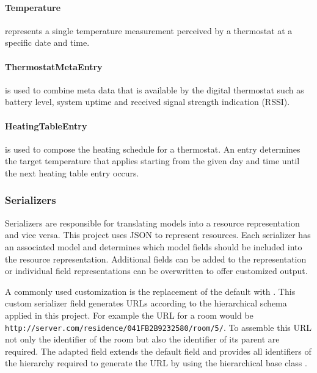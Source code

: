 \paragraph{Temperature} represents a single temperature measurement perceived by a thermostat at a specific date and time.

\paragraph{ThermostatMetaEntry} is used to combine meta data that is available by the digital thermostat such as battery level, system uptime and received signal strength indication (RSSI).

\paragraph{HeatingTableEntry} is used to compose the heating schedule for a thermostat.
An entry determines the target temperature that applies starting from the given day and time until the next heating table entry occurs.

\subsubsection{Serializers}
\label{sec:server_infrastructure_serializers}

Serializers are responsible for translating models into a resource representation and vice versa.
This project uses JSON to represent resources.
Each serializer has an associated model and determines which model fields should be included into the resource representation.
Additional fields can be added to the representation or individual field representations can be overwritten to offer customized output.

A commonly used customization is the replacement of the default  with .
This custom serializer field generates URLs according to the hierarchical schema applied in this project.
For example the URL for a room would be \nolinkurl{http://server.com/residence/041FB2B9232580/room/5/}.
To assemble this URL not only the identifier of the room but also the identifier of its parent are required.
The adapted field extends the default field and provides all identifiers of the hierarchy required to generate the URL by using the hierarchical base class .

